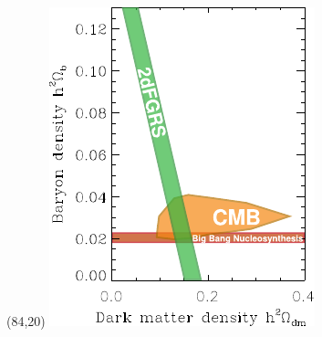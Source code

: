 \documentclass[xcolor=dvipsnames]{beamer}
\begin{document}
\begin{frame}
\begin{textblock}{32}(84,20)
\includegraphics[width=\linewidth]{lcdm2}
\end{textblock}

\end{frame}
\end{document}
